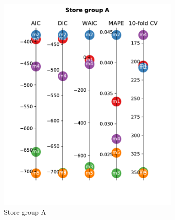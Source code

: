 \documentclass[english, 12pt, a4paper, sci, utf8, a-1b, online]{aaltothesis}
\begin{document}
\begin{abstractpage}[english]
\begin{figure}
	\begin{subfigure}[htb]{0.5\textwidth}
		\centering
		\includegraphics[width=\textwidth]{../plots/metrics/metrics_plot_A.pdf}
		\caption{Store group A}
		\label{fig:metrics_A}
	\end{subfigure}
	\hfill
	\begin{subfigure}[htb]{0.5\textwidth}
		\centering

\end{subfigure}
\end{figure}
\end{abstractpage}
\end{document}
